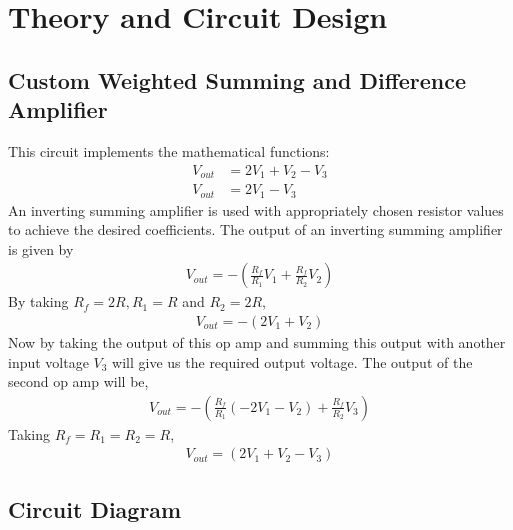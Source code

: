 \documentclass[a4paper,12pt]{article}
\begin{document}
\section*{Theory and Circuit Design}
\subsection*{Custom Weighted Summing and Difference Amplifier}
This circuit implements the mathematical functions:
\begin{align}
    V_{out} &= 2V_1 + V_2 - V_3 \\
    V_{out} &= 2V_1 - V_3
\end{align}
An inverting summing amplifier is used with appropriately chosen resistor values to achieve the desired coefficients.
The output of an inverting summing amplifier is given by
\begin{align}
	V_{out} = -(\frac{R_f}{R_1} V_1 + \frac{R_f}{R_2} V_2)
\end{align}
By taking $R_f = 2R, R_1 = R$ and $R_2 = 2R$,
\begin{align}
	V_{out} = -(2V_1 + V_2)
\end{align}
Now by taking the output of this op amp and summing this output with another input voltage $V_3$ will give us the required output voltage. The output of the second op amp will be,
\begin{align}
	V_{out} = -(\frac{R_f}{R_1} (-2V_1 - V_2) + \frac{R_f}{R_2} V_3)
\end{align}
Taking $R_f = R_1 = R_2 = R$,
\begin{align}
	V_{out} = (2V_1 + V_2 - V_3)
\end{align}

\subsection*{Circuit Diagram}
\end{document}
